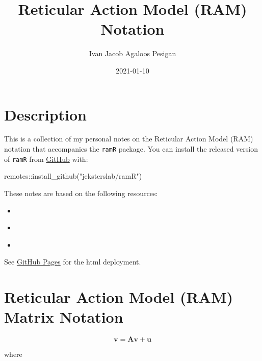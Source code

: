 \documentclass[
]{book}
\title{Reticular Action Model (RAM) Notation}
\author{Ivan Jacob Agaloos Pesigan}
\date{2021-01-10}
\newenvironment{Shaded}{\begin{snugshade}}{\end{snugshade}}
\newcommand{\FunctionTok}[1]{\textcolor[rgb]{0.00,0.00,0.00}{#1}}
\newcommand{\NormalTok}[1]{#1}
\newcommand{\SpecialCharTok}[1]{\textcolor[rgb]{0.00,0.00,0.00}{#1}}
\newcommand{\StringTok}[1]{\textcolor[rgb]{0.31,0.60,0.02}{#1}}
\providecommand{\tightlist}{%
  \setlength{\itemsep}{0pt}\setlength{\parskip}{0pt}}
\begin{document}
\maketitle

{
\setcounter{tocdepth}{1}
\tableofcontents
}
\hypertarget{description}{%
\chapter{Description}\label{description}}

This is a collection of my personal notes on the Reticular Action Model (RAM) notation
that accompanies the \texttt{ramR} package.
You can install the released version of \texttt{ramR} from \href{https://github.com/jeksterslab/ramR}{GitHub} with:

\begin{Shaded}
\begin{Highlighting}[]
\NormalTok{remotes}\SpecialCharTok{::}\FunctionTok{install\_github}\NormalTok{(}\StringTok{"jeksterslab/ramR"}\NormalTok{)}
\end{Highlighting}
\end{Shaded}

These notes are based on the following resources:

\begin{itemize}
\tightlist
\item
  \citet{Boker-2005}
\item
  \citet{McArdle-1984}
\item
  \citet{McArdle-2005}
\end{itemize}

See \href{https://jeksterslab.github.io/ramR_notes/index.html}{GitHub Pages}
for the html deployment.

\hypertarget{ram-matrix-notation}{%
\chapter{Reticular Action Model (RAM) Matrix Notation}\label{ram-matrix-notation}}

\begin{equation}
  \mathbf{v}
  =
  \mathbf{A} \mathbf{v} + \mathbf{u}
\end{equation}

\noindent where
\end{document}
